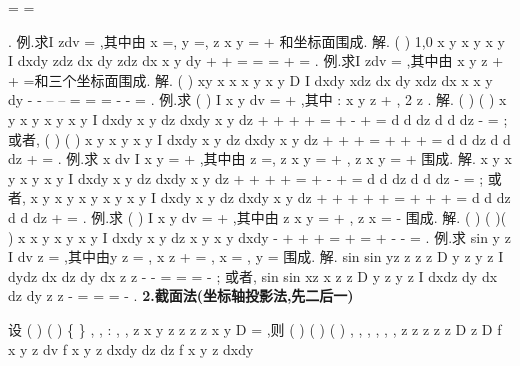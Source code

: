 =
=






\int \int \int 
\int \int 
\int 
\int \int 
\int 
. 
\textcolor{lyred}{例}.求I
zdv
\Omega 
=\int \int \int 
,其中\Omega 由
x =,
y =,
z
x
y
=
+
和坐标面围成. 
解.
(
)
1,0
x
y
x
y
x
y
I
dxdy
zdz
dx dy
zdz
dx
x
y
dy
+
+
\le \le 
\le \le 
=
=
=
+
=
\int \int 
\int 
\int \int 
\int 
\int \int 
. 
\textcolor{lyred}{例}.求I
zdv
\Omega 
=\int \int \int 
,其中\Omega 由
x
y
z
+
+
=和三个坐标面围成. 
解.
(
)
xy
x
x
x
y
x
y
D
I
dxdy
xdz
dx
dy
xdz
dx
x
x
y dy
-
-
--
--
=
=
=
-
-
=
\int \int 
\int 
\int 
\int 
\int 
\int 
\int 
. 
\textcolor{lyred}{例}.求
(
)
I
x
y
dv
\Omega 
=
+
\int \int \int 
,其中
:
x
y
z
\Omega 
+
\le 
, 2
z
\le 
\le . 
解.
(
)
(
)
x
y
x
y
x
y
x
y
I
dxdy
x
y
dz
dxdy
x
y
dz
+
\le 
+
+
\le 
+
=
+
-
+
=
\int \int 
\int 
\int \int 
\int 
d
d
dz
d
d
dz
\pi 
\pi 
\rho 
\rho 
\theta \rho \rho 
\rho 
\theta \rho \rho 
\rho 
\pi 
-
=
\int 
\int 
\int 
\int 
\int 
\int 
; 
或者,
(
)
(
)
x
y
x
y
x
y
I
dxdy
x
y
dz
dxdy
x
y
dz
+
\le 
\le 
+
\le 
+
=
+
+
+
=
\int \int 
\int 
\int \int 
\int 
d
d
dz
d
d
dz
\pi 
\pi 
\rho 
\theta \rho \rho \rho 
\theta \rho \rho 
\rho 
\pi 
+
=
\int 
\int 
\int 
\int 
\int 
\int 
. 
\textcolor{lyred}{例}.求
x dv
I
x
y
\Omega 
=
+
\int \int \int 
,其中\Omega 由
z =,
z
x
y
=
+
,
z
x
y
=
+
围成. 
解.
x
y
x
y
x
y
x
y
I
dxdy
x
y dz
dxdy
x
y dz
+
\le 
+
\le 
+
+
=
+
-
+
=
\int \int 
\int 
\int \int 
\int 
d
d
dz
d
d
dz
\pi 
\pi 
\rho 
\rho 
\theta \rho \rho \rho 
\theta \rho \rho \rho 
\pi 
-
=
\int 
\int 
\int 
\int 
\int 
\int 
; 
或者,
x
y
x
y
x
y
x
y
x
y
I
dxdy
x
y dz
dxdy
x
y dz
+
+
\le 
\le 
+
\le 
+
+
=
+
+
+
=
\int \int 
\int 
\int \int 
\int 
d
d
dz
d
d
dz
\rho 
\pi 
\pi 
\rho 
\rho 
\theta \rho \rho \rho 
\theta \rho \rho \rho 
\pi 
+
=
\int 
\int 
\int 
\int 
\int 
\int 
. 
\textcolor{lyred}{例}.求
(
)
I
x
y
dv
\Omega 
=
+
\int \int \int 
,其中\Omega 由
z
x
y
=
+
,
z
x
=
-
围成. 
解.
(
)
(
)(
)
x
x
y
x
y
x
y
I
dxdy
x
y
dz
x
y
x
y
dxdy
\pi 
-
+
\le 
+
+
\le 
=
+
=
+
-
-
=
\int \int 
\int 
\int \int 
. 
\textcolor{lyred}{例}.求
sin
y
z
I
dv
z
\Omega 
=\int \int \int 
,其中\Omega 由y
z
=
,
x
z
\pi 
+
=
,
x =
,
y =
围成. 
解.
sin
sin
yz
z
z
z
D
y
z
y
z
I
dydz
dx
dz
dy
dx
z
z
\pi 
\pi 
\pi 
\pi 
-
-
=
=
=
-
\int \int 
\int 
\int 
\int 
\int 
; 
或者,
sin
sin
xz
x
z
z
D
y
z
y
z
I
dxdz
dy
dx
dz
dy
z
z
\pi 
\pi 
\pi 
-
=
=
=
-
\int \int 
\int 
\int 
\int 
\int 
. 
{\bfseries \textcolor{lyred}{2.截面法(坐标轴投影法,先二后一)}}

设
(
)
(
)
\{
\}
, ,
:
,
,
z
x y z
z
z
z
x y
D
\Omega =
\le 
\le 
\in 
,则 
(
)
(
)
(
)
, ,
, ,
, ,
z
z
z
z
z
D
z
D
f x y z dv
f x y z dxdy dz
dz
f x y z dxdy
\Omega 


